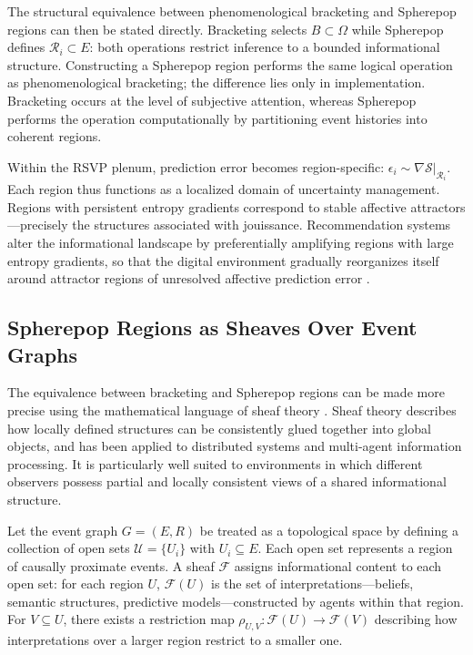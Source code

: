 \documentclass[12pt,a4paper]{article}
\begin{document}
The structural equivalence between phenomenological bracketing and Spherepop regions can then
be stated directly. Bracketing selects $B \subset \Omega$ while Spherepop defines
$\mathcal{R}_i \subset E$: both operations restrict inference to a bounded informational
structure. Constructing a Spherepop region performs the same logical operation as
phenomenological bracketing; the difference lies only in implementation. Bracketing occurs
at the level of subjective attention, whereas Spherepop performs the operation computationally
by partitioning event histories into coherent regions.

Within the RSVP plenum, prediction error becomes region-specific: $\epsilon_i \sim \nabla\mathcal{S}|_{\mathcal{R}_i}$.
Each region thus functions as a localized domain of uncertainty management. Regions with
persistent entropy gradients correspond to stable affective attractors---precisely the
structures associated with jouissance. Recommendation systems alter the informational
landscape by preferentially amplifying regions with large entropy gradients, so that the
digital environment gradually reorganizes itself around attractor regions of unresolved
affective prediction error \citep{zuboff2019,vosoughi2018}.

\subsection*{Spherepop Regions as Sheaves Over Event Graphs}

The equivalence between bracketing and Spherepop regions can be made more precise using the
mathematical language of sheaf theory \citep{zuboff2019}. Sheaf theory describes how locally
defined structures can be consistently glued together into global objects, and has been
applied to distributed systems and multi-agent information processing. It is particularly
well suited to environments in which different observers possess partial and locally
consistent views of a shared informational structure.

Let the event graph $G = (E, R)$ be treated as a topological space by defining a collection
of open sets $\mathcal{U} = \{U_i\}$ with $U_i \subseteq E$. Each open set represents a
region of causally proximate events. A sheaf $\mathcal{F}$ assigns informational content to
each open set: for each region $U$, $\mathcal{F}(U)$ is the set of interpretations---beliefs,
semantic structures, predictive models---constructed by agents within that region. For
$V \subseteq U$, there exists a restriction map $\rho_{U,V} : \mathcal{F}(U) \to \mathcal{F}(V)$
describing how interpretations over a larger region restrict to a smaller one.
\end{document}
